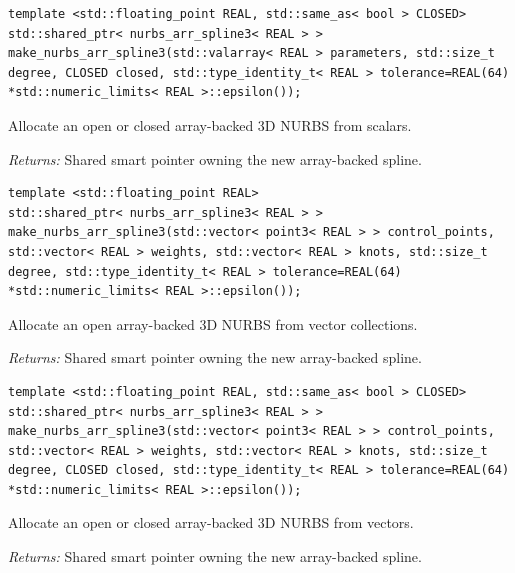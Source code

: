 \par\noindent\begin{minipage}{\linewidth}
\begin{lstlisting}[style=apireference]
template <std::floating_point REAL, std::same_as< bool > CLOSED>
std::shared_ptr< nurbs_arr_spline3< REAL > > make_nurbs_arr_spline3(std::valarray< REAL > parameters, std::size_t degree, CLOSED closed, std::type_identity_t< REAL > tolerance=REAL(64) *std::numeric_limits< REAL >::epsilon());
\end{lstlisting}
{\footnotesize Allocate an open or closed array-backed 3D NURBS from scalars.\par}
{\footnotesize\textit{Returns:} Shared smart pointer owning the new array-backed spline.\par}
\end{minipage}\par\vspace{1pt}
\par\noindent\begin{minipage}{\linewidth}
\begin{lstlisting}[style=apireference]
template <std::floating_point REAL>
std::shared_ptr< nurbs_arr_spline3< REAL > > make_nurbs_arr_spline3(std::vector< point3< REAL > > control_points, std::vector< REAL > weights, std::vector< REAL > knots, std::size_t degree, std::type_identity_t< REAL > tolerance=REAL(64) *std::numeric_limits< REAL >::epsilon());
\end{lstlisting}
{\footnotesize Allocate an open array-backed 3D NURBS from vector collections.\par}
{\footnotesize\textit{Returns:} Shared smart pointer owning the new array-backed spline.\par}
\end{minipage}\par\vspace{1pt}
\par\noindent\begin{minipage}{\linewidth}
\begin{lstlisting}[style=apireference]
template <std::floating_point REAL, std::same_as< bool > CLOSED>
std::shared_ptr< nurbs_arr_spline3< REAL > > make_nurbs_arr_spline3(std::vector< point3< REAL > > control_points, std::vector< REAL > weights, std::vector< REAL > knots, std::size_t degree, CLOSED closed, std::type_identity_t< REAL > tolerance=REAL(64) *std::numeric_limits< REAL >::epsilon());
\end{lstlisting}
{\footnotesize Allocate an open or closed array-backed 3D NURBS from vectors.\par}
{\footnotesize\textit{Returns:} Shared smart pointer owning the new array-backed spline.\par}
\end{minipage}\par\vspace{1pt}
